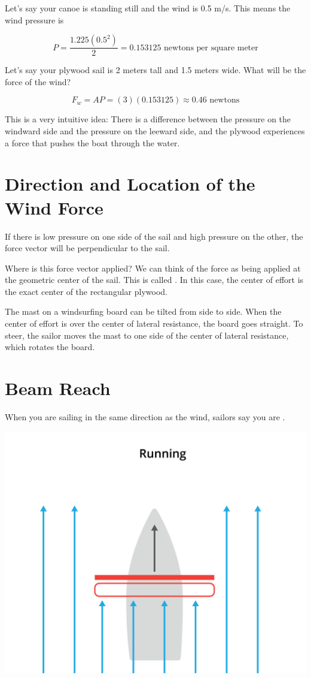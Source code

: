 Let's say your canoe is standing still and the wind is 0.5 m/s.  This means the wind pressure is

$$P =  \frac{1.225 (0.5^2)}{2} =  0.153125 \text{ newtons per square meter}$$

Let's say your plywood sail is 2 meters tall and 1.5 meters wide.  What will be the force of the wind?

$$F_w  = A P = (3)(0.153125) \approx 0.46 \text{ newtons}$$

This is a very intuitive idea: There is a difference between the pressure on the windward side and the pressure on the leeward side, and the plywood experiences a force that pushes
the boat through the water.



\section{Direction and Location of the Wind Force}

If there is low pressure on one side of the sail and high pressure on the other,  the force vector will be perpendicular to the sail. 
 
Where is this force vector applied?  We can think of the force as being applied at the geometric center of the sail.  This is called . In this case,  the center of effort is the exact center of the rectangular plywood.

The mast on a windsurfing board can be tilted from side to side.  When the center of effort is over the center of lateral resistance,  the board goes straight.
To steer, the sailor moves the mast to one side of the center of lateral resistance, which rotates the board.

\section{Beam Reach}

When you are sailing in the same direction as the wind, sailors say you are .   

\includegraphics[width=.75\textwidth]{running.png}


